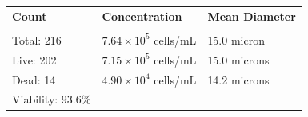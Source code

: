 \documentclass[UTF8,10pt,a4paper,fontset=fandol]{ctexart}
\newcommand{\fieldvalue}[1]{#1}
\begin{document}
\begin{tabularx}{\textwidth}{@{}X X X@{}}
\textbf{Count} & \textbf{Concentration} & \textbf{Mean Diameter} \\
\noalign{\smallskip}
\underline{\hspace{0.9\linewidth}} &
\underline{\hspace{0.9\linewidth}} &
\underline{\hspace{0.9\linewidth}} \\[-2pt]
Total: %
\fieldvalue{216}
&
%
\fieldvalue{$7.64\times 10^{5}$ cells/mL}
&
%
\fieldvalue{15.0 micron}
\\
Live: %
\fieldvalue{202}
&
%
\fieldvalue{$7.15\times 10^{5}$ cells/mL}
&
%
\fieldvalue{15.0 microns}
\\
Dead: %
\fieldvalue{14}
&
%
\fieldvalue{$4.90\times 10^{4}$ cells/mL}
&
%
\fieldvalue{14.2 microns}
\\
Viability: %
\fieldvalue{93.6\%}
&
&
\end{tabularx}

\vspace{1em}

\noindent
\begin{minipage}[t]{0.47\textwidth}
\centering
{}
\end{minipage}
\hfill
\begin{minipage}[t]{0.47\textwidth}
\centering
{}
\end{minipage}

\vspace{1em}

\noindent
\begin{minipage}[t]{0.47\textwidth}
\centering
{}
\end{minipage}
\hfill
\begin{minipage}[t]{0.47\textwidth}
\centering
{}
\end{minipage}
\end{document}
